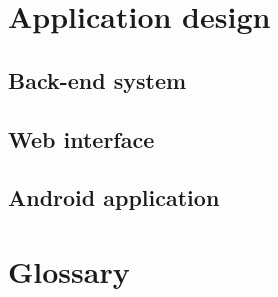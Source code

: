 \documentclass[12pt]{article}
\begin{document}
		\vspace{0.2in}
		
		
		
	\section{Application design}
	
		\vspace{0.2in}
		
		
		
	\subsection{Back-end system}

		\vspace{0.2in}
		
		
		
		
	\subsection{Web interface}

	\vspace{0.2in}
	
	
	\subsection{Android application}
			
	\vspace{0.2in}
	
	
	
	
	\vspace{0.2in}

	
	\newpage	
	\section{Glossary}
	
\end{document}

